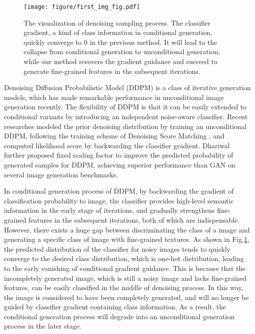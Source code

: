 \documentclass[runningheads]{llncs}
\begin{document}
\begin{figure}[t!]
    \begin{center}
    \texttt{[image: figure/first\_img\_fig.pdf]}
\caption{
The visualization of denoising sampling process. The classifier gradient, a kind of class information in conditional generation, quickly converge to 0 in the previous method. It will lead to the collapse from conditional generation to unconditional generation, while our method recovers the gradient guidance and succeed to generate fine-grained features in the subsequent iterations.
}\label{fig:coverge}
   
    \end{center}
    \vskip -0.2in
\end{figure} 
Denoising Diffusion Probabilistic Model (DDPM) \cite{ho2020denoising,nichol2021improved,song2020denoising} is a class of iterative generation models, which has made remarkable performance in unconditional image generation recently.
The flexibility of DDPM  \cite{dhariwal2021diffusion,dickstein} is that it can be easily extended to conditional variants by introducing an independent noise-aware classifier.
Recent researches modeled the prior denoising distribution by training an unconditional DDPM, following the training scheme of Denoising Score Matching \cite{vincent2011connection}, and computed likelihood score by backwarding the classifier gradient.
Dhariwal \etal~\cite{dhariwal2021diffusion} further proposed fixed scaling factor to improve the predicted probability of generated samples for DDPM, achieving superior performance than GAN on several image generation benchmarks.


In conditional generation process of DDPM, by backwarding the gradient of classification probability to image, the classifier provides high-level semantic information in the early stage of iterations, and gradually strengthens fine-grained features in the subsequent iterations, both of which are indispensable. 
However, there exists a huge gap between discriminating the class of a image and generating a specific class of image with fine-grained textures. As shown in Fig.\ref{fig:coverge}, the predicted distribution of the classifier for noisy images tends to quickly converge to the desired class distribution, which is one-hot distribution, leading to the early vanishing of conditional gradient guidance. This is because that the incompletely generated image, which is still a noisy image and lacks fine-grained features, can be easily classified in the middle of denoising process.
In this way, the image is considered to have been completely generated, and will no longer be guided by classifier gradient containing class information. As a result, the conditional generation process will degrade into an unconditional generation process in the later stage. 
 
\end{document}
